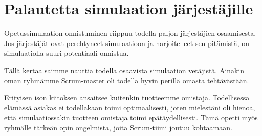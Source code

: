 \documentclass[a4paper]{article}
\begin{document}
\section{Palautetta simulaation järjestäjille}

Opetussimulaation onnistuminen riippuu todella paljon järjestäjien osaamisesta. Jos järjestäjät ovat perehtyneet simulaatioon ja harjoitelleet sen pitämistä, on simulaatiolla suuri potentiaali onnistua.

Tällä kertaa saimme nauttia todella osaavista simulaation vetäjistä. Ainakin oman ryhmämme Scrum-master oli todella hyvin perillä omasta tehtävästään.

Erityisen ison kiitoksen ansaitsee kuitenkin tuotteemme omistaja. Todellisessa elämässä asiakas ei todellakaan toimi optimaalisesti, joten mielestäni oli hienoa, että simulaatiossakin tuotteen omistaja toimi epätäydellisesti. Tämä opetti myös ryhmälle tärkeän opin ongelmista, joita Scrum-tiimi joutuu kohtaamaan.
\end{document}
